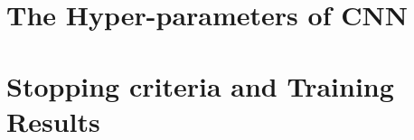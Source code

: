 \section{The Hyper-parameters of CNN}\label{sec:config}
\section{Stopping criteria and Training Results}\label{sec:training}
%
%
%
%
%
%
